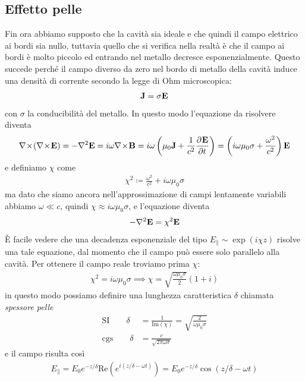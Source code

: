 \subsection{Effetto pelle}
Fin ora abbiamo supposto che la cavità sia ideale e che quindi il campo elettrico ai bordi sia nullo, tuttavia quello che si verifica nella realtà è che il 
campo ai bordi è molto piccolo ed entrando nel metallo decresce esponenzialmente. Questo succede perché il campo diverso da zero nel bordo di metallo della 
cavità induce una densità di corrente secondo la legge di Ohm microscopica:
\begin{align}
  \mathbf{ J } = \sigma \mathbf{ E }
\end{align}
con $ \sigma $ la conducibilità del metallo. In questo modo l'equazione da risolvere diventa
\begin{align}
  \nabla\!\times\! (\nabla \! \times \! \mathbf{ E }) = - \nabla^2 \mathbf{ E } = i \omega \nabla\!\times\!\mathbf{ B } 
  = i \omega \left( \mu_0 \mathbf{ J } + \frac{1}{c^2} \frac{\partial^{} {\mathbf{ E }}}{\partial {t}^{}} \right) 
  = \left( i \omega \mu_0 \sigma + \frac{\omega^2}{c^2} \right) \mathbf{ E }
\end{align}
e definiamo $ \chi $ come
\begin{align}
  \chi^2 \coloneqq \frac{\omega^2}{c^2} + i \omega \mu_0 \sigma 
\end{align}
ma dato che siamo ancora nell'approssimazione di campi lentamente variabili abbiamo $ \omega \ll c $, quindi $ \chi \approx i \omega \mu_0 \sigma $, 
e l'equazione diventa
\begin{align}
  -\nabla^2 \mathbf{ E } = \chi^2 \mathbf{ E }
\end{align}
È facile vedere che una decadenza esponenziale del tipo $ E_{\parallel} \sim \exp(i\chi z) $ risolve una tale equazione, dal momento che il campo può 
essere solo parallelo alla cavità. Per ottenere il campo reale troviamo prima $ \chi $:
\begin{align}
  \chi^2 = i \omega \mu_0 \sigma \implies \chi = \sqrt{\frac{\omega \mu_0 \sigma}{2}} (1+i)
\end{align}
in questo modo possiamo definire una lunghezza caratteristica $ \delta $ chiamata \textit{spessore pelle}
\begin{align}
  \text{SI} \qquad \delta &= \frac{1}{\text{Im}(\chi)} = \sqrt{\frac{2}{\omega \mu_0 \sigma}}
  \\
  \text{cgs} \qquad \delta &= \frac{c}{\sqrt{2\pi \omega \sigma}}
\end{align}
e il campo risulta così
\begin{align}
  E_\parallel = E_0 e^{-z/\delta} \text{Re}(e^{i(z/\delta - \omega t)}) 
  = E_0 e^{-z/\delta} \cos \left( z/\delta -\omega t\right)
\end{align}

